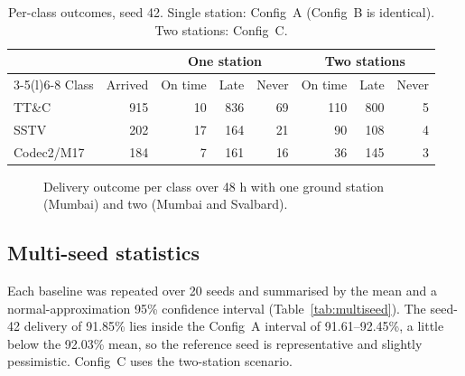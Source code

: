 \documentclass[preprint,12pt]{elsarticle}
\newcommand{\cfgA}{Config~A}
\newcommand{\cfgB}{Config~B}
\newcommand{\cfgC}{Config~C}
\newcommand{\ttc}{TT\&C}
\begin{document}
\begin{table}[t]
\centering
\small
\caption{Per-class outcomes, seed 42. Single station: \cfgA{} (\cfgB{} is identical). Two stations: \cfgC{}.}
\label{tab:per-class}
\begin{tabular}{@{}lrrrrrrr@{}}
\toprule
& & \multicolumn{3}{c}{One station} & \multicolumn{3}{c}{Two stations} \\
\cmidrule(lr){3-5}\cmidrule(l){6-8}
Class & Arrived & On time & Late & Never & On time & Late & Never \\
\midrule
\ttc{} & 915 & 10 & 836 & 69 & 110 & 800 & 5 \\
SSTV & 202 & 17 & 164 & 21 & 90 & 108 & 4 \\
Codec2/M17 & 184 & 7 & 161 & 16 & 36 & 145 & 3 \\
\bottomrule
\end{tabular}
\end{table}

\begin{figure}[t]
\centering
{}
\caption{Delivery outcome per class over 48 h with one ground station (Mumbai) and two (Mumbai and Svalbard).}
\label{fig:per-class}
\end{figure}

\subsection{Multi-seed statistics}

Each baseline was repeated over 20 seeds and summarised by the mean and a normal-approximation 95\% confidence interval (Table~\ref{tab:multiseed}). The seed-42 delivery of 91.85\% lies inside the \cfgA{} interval of 91.61--92.45\%, a little below the 92.03\% mean, so the reference seed is representative and slightly pessimistic. \cfgC{} uses the two-station scenario.
\end{document}
